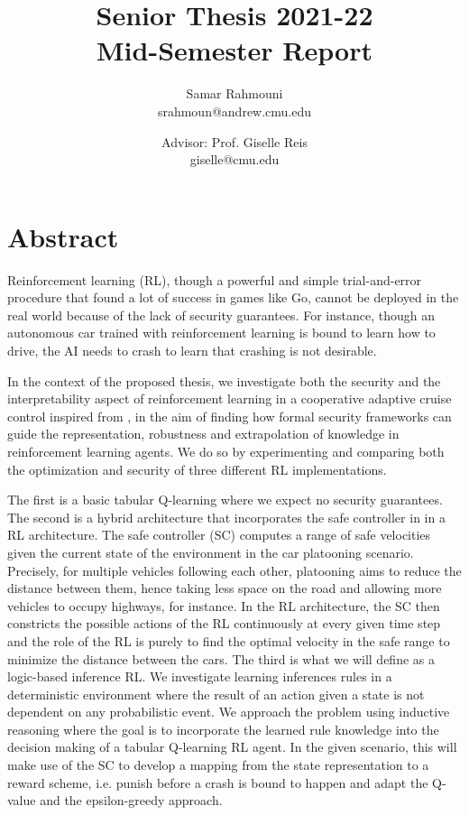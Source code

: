 \documentclass[a4paper,11pt]{article}
\author{%
  \begin{minipage}[t]{0.47\textwidth}
    \centering
    Samar Rahmouni \\ srahmoun@andrew.cmu.edu
  \end{minipage}
  \and
  \begin{minipage}[t]{0.45\textwidth}
    \centering
    Advisor: Prof. Giselle Reis \\ giselle@cmu.edu
  \end{minipage}%
  \vspace*{2ex}
}
\date{}
\title{{\Large\sc Senior Thesis 2021-22\\[2ex]}{\LARGE\bf Mid-Semester Report\vspace*{3ex}}}
\begin{document}
\maketitle 

\section{Abstract}
Reinforcement learning (RL), though a powerful and simple trial-and-error procedure that found a lot of success in games like Go, cannot be deployed in the real world 
because of the lack of security guarantees. For instance, though an autonomous car trained with reinforcement learning is bound to learn how to drive, the AI needs to crash 
to learn that crashing is not desirable. 

\medskip

In the context of the proposed thesis, we investigate both the security and the interpretability aspect of reinforcement learning in a cooperative adaptive cruise control inspired from \cite{vnc20},
in the aim of finding how formal security frameworks can guide the representation, robustness and extrapolation of knowledge in reinforcement
learning agents. We do so by experimenting and comparing both the optimization and security of three different RL implementations. 

\medskip

The first is a basic tabular Q-learning where we expect no security guarantees. The second is a hybrid architecture that incorporates the safe controller in \cite{vnc20} in a RL architecture. 
The safe controller (SC) computes a range of safe velocities given the current state of the environment in the car platooning scenario. Precisely, for multiple vehicles following each other, platooning aims to reduce the distance between them, hence taking less space on the road 
and allowing more vehicles to occupy highways, for instance. In the RL architecture, the SC then constricts the possible actions of the RL continuously at every given time step and the role of the RL is purely 
to find the optimal velocity in the safe range to minimize the distance between the cars. The third is what we will define as a logic-based inference RL. We investigate learning inferences rules in a deterministic environment 
where the result of an action given a state is not dependent on any probabilistic event. We approach the problem using inductive reasoning where the goal is to incorporate the learned rule knowledge into the decision making of a tabular Q-learning RL agent. 
In the given scenario, this will make use of the SC to develop a mapping from the state representation to a reward scheme, i.e. punish before a crash is bound to happen and adapt the Q-value and the epsilon-greedy approach. 
\end{document}
